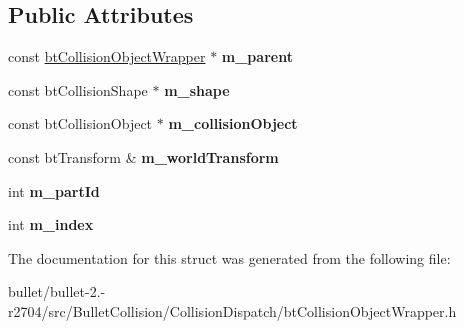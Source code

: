 \subsection*{Public Attributes}
\begin{DoxyCompactItemize}
\item 
\hypertarget{structbt_collision_object_wrapper_ae30b06e882db08b012f6e3c51a0cd2be}{const \hyperlink{structbt_collision_object_wrapper}{bt\+Collision\+Object\+Wrapper} $\ast$ {\bfseries m\+\_\+parent}}\label{structbt_collision_object_wrapper_ae30b06e882db08b012f6e3c51a0cd2be}

\item 
\hypertarget{structbt_collision_object_wrapper_ac471921089ff3f5b0dce4860850ec2b0}{const bt\+Collision\+Shape $\ast$ {\bfseries m\+\_\+shape}}\label{structbt_collision_object_wrapper_ac471921089ff3f5b0dce4860850ec2b0}

\item 
\hypertarget{structbt_collision_object_wrapper_a98ce188eee69ab9c01ebb0023fcd661d}{const bt\+Collision\+Object $\ast$ {\bfseries m\+\_\+collision\+Object}}\label{structbt_collision_object_wrapper_a98ce188eee69ab9c01ebb0023fcd661d}

\item 
\hypertarget{structbt_collision_object_wrapper_a575e2be66a7fb74d3d1b8e5f1c48b2f9}{const bt\+Transform \& {\bfseries m\+\_\+world\+Transform}}\label{structbt_collision_object_wrapper_a575e2be66a7fb74d3d1b8e5f1c48b2f9}

\item 
\hypertarget{structbt_collision_object_wrapper_a0908062491f661f426b32dce15cfa812}{int {\bfseries m\+\_\+part\+Id}}\label{structbt_collision_object_wrapper_a0908062491f661f426b32dce15cfa812}

\item 
\hypertarget{structbt_collision_object_wrapper_afc165400299906e5880907d422f7402d}{int {\bfseries m\+\_\+index}}\label{structbt_collision_object_wrapper_afc165400299906e5880907d422f7402d}

\end{DoxyCompactItemize}


The documentation for this struct was generated from the following file\+:\begin{DoxyCompactItemize}
\item 
bullet/bullet-\/2.-\/r2704/src/\+Bullet\+Collision/\+Collision\+Dispatch/bt\+Collision\+Object\+Wrapper.\+h\end{DoxyCompactItemize}
